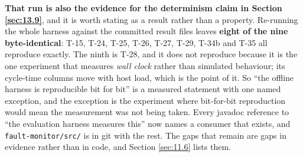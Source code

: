 \textbf{That run is also the evidence for the determinism claim in Section \ref{sec:13.9}}, and it is worth
stating as a result rather than a property. Re-running the whole harness against the committed
result files leaves \textbf{eight of the nine byte-identical}: T-15, T-24, T-25, T-26, T-27, T-29,
T-34b and T-35 all reproduce exactly. The ninth is T-28, and it does not reproduce because it is the
one experiment that measures \emph{wall clock} rather than simulated behaviour; its cycle-time
columns move with host load, which is the point of it. So ``the offline harness is reproducible bit
for bit'' is a measured statement with one named exception, and the exception is the experiment
where bit-for-bit reproduction would mean the measurement was not being taken. Every javadoc reference
to ``the evaluation harness measures this'' now names a consumer that exists, and
\texttt{fault-monitor/src/} is in git with the rest. The gaps that remain are gaps in evidence
rather than in code, and Section \ref{sec:11.6} lists them.\label{sec:Kend}
